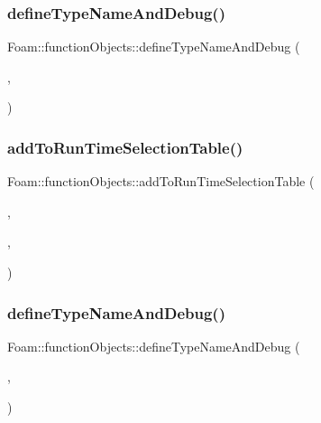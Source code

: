 \subsubsection{\texorpdfstring{define\+Type\+Name\+And\+Debug()}{defineTypeNameAndDebug()}\hspace{0.1cm}{\footnotesize\ttfamily [5/8]}}
{\footnotesize\ttfamily Foam\+::function\+Objects\+::define\+Type\+Name\+And\+Debug (\begin{DoxyParamCaption}\item[{\hyperlink{classFoam_1_1functionObjects_1_1stopIfMaxFieldDiff}{stop\+If\+Max\+Field\+Diff}}]{,  }\item[{0}]{ }\end{DoxyParamCaption})}

\mbox{\label{namespaceFoam_1_1functionObjects_a01929853a60a374a0d92e7492cd44f34}} 
\subsubsection{\texorpdfstring{add\+To\+Run\+Time\+Selection\+Table()}{addToRunTimeSelectionTable()}\hspace{0.1cm}{\footnotesize\ttfamily [5/8]}}
{\footnotesize\ttfamily Foam\+::function\+Objects\+::add\+To\+Run\+Time\+Selection\+Table (\begin{DoxyParamCaption}\item[{function\+Object}]{,  }\item[{\hyperlink{classFoam_1_1functionObjects_1_1stopIfMaxFieldDiff}{stop\+If\+Max\+Field\+Diff}}]{,  }\item[{dictionary}]{ }\end{DoxyParamCaption})}

\mbox{\label{namespaceFoam_1_1functionObjects_aa5654f26f41b0e0637778be63ed0f3b5}} 
\subsubsection{\texorpdfstring{define\+Type\+Name\+And\+Debug()}{defineTypeNameAndDebug()}\hspace{0.1cm}{\footnotesize\ttfamily [6/8]}}
{\footnotesize\ttfamily Foam\+::function\+Objects\+::define\+Type\+Name\+And\+Debug (\begin{DoxyParamCaption}\item[{\hyperlink{classFoam_1_1functionObjects_1_1TBulk}{T\+Bulk}}]{,  }\item[{0}]{ }\end{DoxyParamCaption})}

